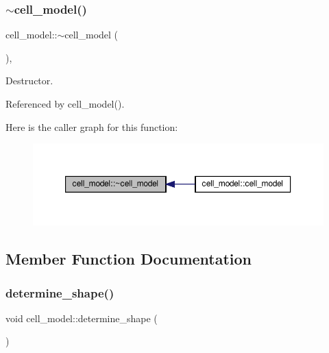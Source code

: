 \subsubsection{\texorpdfstring{$\sim$cell\+\_\+model()}{~cell\_model()}}
{\footnotesize\ttfamily cell\+\_\+model\+::$\sim$cell\+\_\+model (\begin{DoxyParamCaption}{ }\end{DoxyParamCaption})\hspace{0.3cm}{\ttfamily [override]}, {\ttfamily [default]}}



Destructor. 



Referenced by cell\+\_\+model().

Here is the caller graph for this function\+:
\nopagebreak
\begin{figure}[H]
\begin{center}
\leavevmode
\includegraphics[width=350pt]{d6/dcd/classcell__model_a24b20b8eba4c8f1da11d94c3b3d5c226_icgraph}
\end{center}
\end{figure}


\subsection{Member Function Documentation}
\mbox{\label{classcell__model_aab9cb5e9e92455f55515db7b4ca47e8b}} 
\subsubsection{\texorpdfstring{determine\+\_\+shape()}{determine\_shape()}}
{\footnotesize\ttfamily void cell\+\_\+model\+::determine\+\_\+shape (\begin{DoxyParamCaption}{ }\end{DoxyParamCaption})\hspace{0.3cm}{\ttfamily [protected]}}



